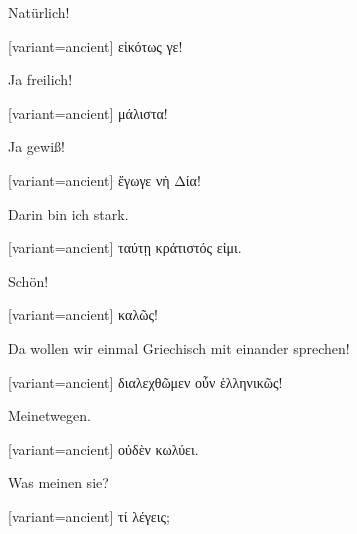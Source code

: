 Natürlich!

\switchcolumn

\begin{greek}[variant=ancient]%
εἰκότως γε!

\end{greek}%
\switchcolumn*

Ja freilich!

\switchcolumn

\begin{greek}[variant=ancient]%
μάλιστα!

\end{greek}%
\switchcolumn*

Ja gewiß!

\switchcolumn

\begin{greek}[variant=ancient]%
ἔγωγε νὴ Δία!

\end{greek}%
\switchcolumn*

Darin bin ich stark.

\switchcolumn

\begin{greek}[variant=ancient]%
ταύτῃ κράτιστός εἰμι.

\end{greek}%
\switchcolumn*

Schön!

\switchcolumn

\begin{greek}[variant=ancient]%
καλῶς!

\end{greek}%
\switchcolumn*

Da wollen wir einmal Griechisch mit einander sprechen!

\switchcolumn

\begin{greek}[variant=ancient]%
διαλεχθῶμεν οὖν ἑλληνικῶς!

\end{greek}%
\switchcolumn*

Meinetwegen.

\switchcolumn

\begin{greek}[variant=ancient]%
οὐδὲν κωλύει.

\end{greek}%
\switchcolumn*

Was meinen sie?

\switchcolumn

\begin{greek}[variant=ancient]%
τί λέγεις;

\end{greek}%
\switchcolumn*

